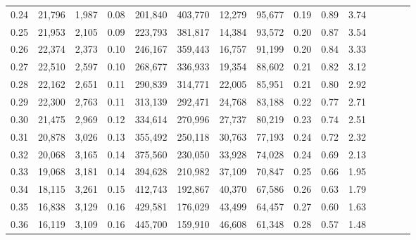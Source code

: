 \begin{tabular}{rrrcrrrrrrrrrrr}
0.24 &  21,796 &  1,987 &                                       0.08 &  201,840 &  403,770 &   12,279 &   95,677 &  0.19 &  0.89 &                         3.74 \\
0.25 &  21,953 &  2,105 &                                       0.09 &  223,793 &  381,817 &   14,384 &   93,572 &  0.20 &  0.87 &                         3.54 \\
0.26 &  22,374 &  2,373 &                                       0.10 &  246,167 &  359,443 &   16,757 &   91,199 &  0.20 &  0.84 &                         3.33 \\
0.27 &  22,510 &  2,597 &                                       0.10 &  268,677 &  336,933 &   19,354 &   88,602 &  0.21 &  0.82 &                         3.12 \\
0.28 &  22,162 &  2,651 &                                       0.11 &  290,839 &  314,771 &   22,005 &   85,951 &  0.21 &  0.80 &                         2.92 \\
0.29 &  22,300 &  2,763 &                                       0.11 &  313,139 &  292,471 &   24,768 &   83,188 &  0.22 &  0.77 &                         2.71 \\
0.30 &  21,475 &  2,969 &                                       0.12 &  334,614 &  270,996 &   27,737 &   80,219 &  0.23 &  0.74 &                         2.51 \\
0.31 &  20,878 &  3,026 &                                       0.13 &  355,492 &  250,118 &   30,763 &   77,193 &  0.24 &  0.72 &                         2.32 \\
0.32 &  20,068 &  3,165 &                                       0.14 &  375,560 &  230,050 &   33,928 &   74,028 &  0.24 &  0.69 &                         2.13 \\
0.33 &  19,068 &  3,181 &                                       0.14 &  394,628 &  210,982 &   37,109 &   70,847 &  0.25 &  0.66 &                         1.95 \\
0.34 &  18,115 &  3,261 &                                       0.15 &  412,743 &  192,867 &   40,370 &   67,586 &  0.26 &  0.63 &                         1.79 \\
0.35 &  16,838 &  3,129 &                                       0.16 &  429,581 &  176,029 &   43,499 &   64,457 &  0.27 &  0.60 &                         1.63 \\
0.36 &  16,119 &  3,109 &                                       0.16 &  445,700 &  159,910 &   46,608 &   61,348 &  0.28 &  0.57 &                         1.48 \\

\end{tabular}
